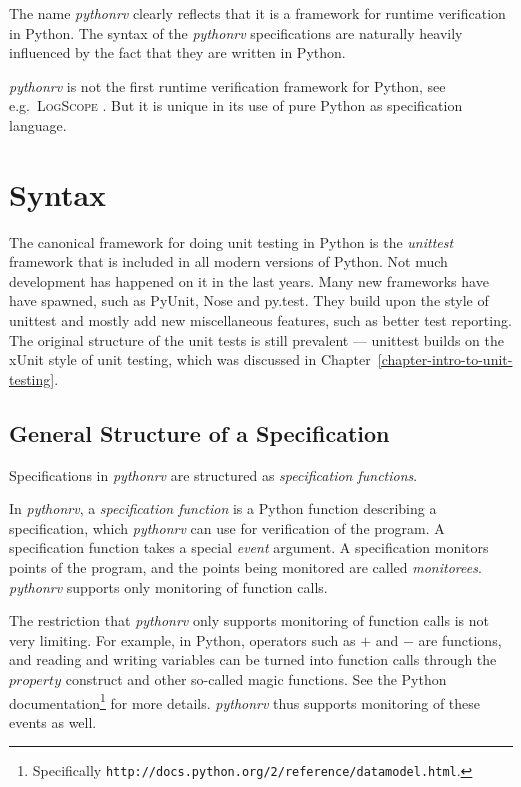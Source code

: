 The name \textit{pythonrv} clearly reflects that it is a framework for runtime
verification in Python. The syntax of the \textit{pythonrv} specifications are
naturally heavily influenced by the fact that they are written in Python.

\textit{pythonrv} is not the first runtime verification framework for Python,
see e.g.\ \textsc{LogScope} \cite{barringer09tutorial}. But it is unique in its
use of pure Python as specification language.


\section{Syntax} \label{section-approach-syntax}

The canonical framework for doing unit testing in Python is the
\textit{unittest} framework that is included in all modern versions of Python.
Not much development has happened on it in the last years. Many new frameworks
have have spawned, such as PyUnit, Nose and py.test. They build upon the style
of unittest and mostly add new miscellaneous features, such as better test
reporting. The original structure of the unit tests is still prevalent ---
unittest builds on the xUnit style of unit testing, which was discussed in
Chapter~\ref{chapter-intro-to-unit-testing}.

\subsection{General Structure of a Specification}

Specifications in \textit{pythonrv} are structured as \textit{specification
functions}.

\begin{mydef}\label{def-specification-function}
In \textit{pythonrv}, a \textit{specification function} is a Python function
describing a specification, which \textit{pythonrv} can use for verification of
the program. A specification function takes a special \textit{event} argument.
A specification monitors points of the program, and the points being monitored
are called \textit{monitorees}. \textit{pythonrv} supports only monitoring of
function calls.
\end{mydef}

The restriction that \textit{pythonrv} only supports monitoring of function
calls is not very limiting. For example, in Python, operators such as $+$
and $-$ are functions, and reading and writing variables can be turned into
function calls through the $property$ construct and other so-called magic
functions. See the Python documentation\footnote{Specifically
\texttt{http://docs.python.org/2/reference/datamodel.html}.} for more details.
\textit{pythonrv} thus supports monitoring of these events as well.

